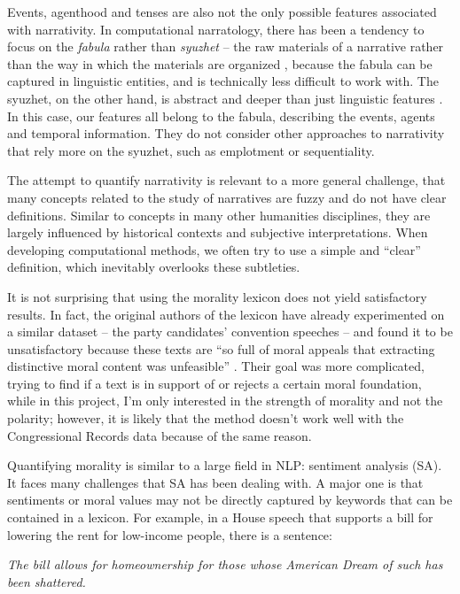 \documentclass[a4paper]{article}
\begin{document}
Events, agenthood and tenses are also not the only possible features associated with narrativity. In computational narratology, there has been a tendency to focus on the \emph{fabula} rather than \emph{syuzhet} -- the raw materials of a narrative rather than the way in which the materials are organized \cite{Sklovskij1965art}, because the fabula can be captured in linguistic entities, and is technically less difficult to work with. The syuzhet, on the other hand, is abstract and deeper than just linguistic features \cite{greimas1971narrative}. In this case, our features all belong to the fabula, describing the events, agents and temporal information. They do not consider other approaches to narrativity that rely more on the syuzhet, such as emplotment or sequentiality. 

The attempt to quantify narrativity is relevant to a more general challenge, that many concepts related to the study of narratives are fuzzy and do not have clear definitions. Similar to concepts in many other humanities disciplines, they are largely influenced by historical contexts and subjective interpretations. When developing computational methods, we often try to use a simple and ``clear'' definition, which inevitably overlooks these subtleties. 

It is not surprising that using the morality lexicon does not yield satisfactory results. In fact, the original authors of the lexicon have already experimented on a similar dataset -- the party candidates' convention speeches -- and found it to be unsatisfactory because these texts are ``so full of moral appeals that extracting distinctive moral content was unfeasible'' \cite{graham2009liberals}. Their goal was more complicated, trying to find if a text is in support of or rejects a certain moral foundation, while in this project, I'm only interested in the strength of morality and not the polarity; however, it is likely that the method doesn't work well with the Congressional Records data because of the same reason.

Quantifying morality is similar to a large field in NLP: sentiment analysis (SA). It faces many challenges that SA has been dealing with. A major one is that sentiments or moral values may not be directly captured by keywords that can be contained in a lexicon. For example, in a House speech that supports a bill for lowering the rent for low-income people, there is a sentence:

\emph{The bill allows for homeownership for those whose American Dream of such has been shattered.}
\end{document}
